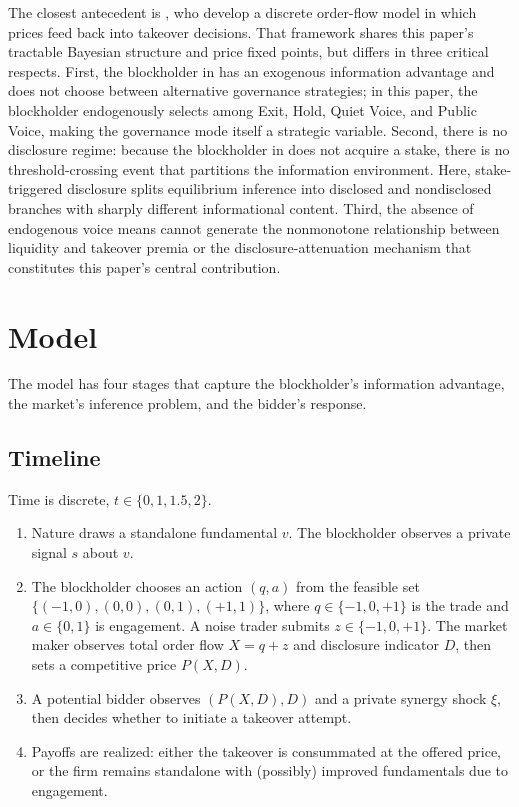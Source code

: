 \documentclass[11pt]{article}
\newcommand{\1}{\mathbf{1}}
\begin{document}
The closest antecedent is \citet{EdmansGoldsteinJiang2015}, who develop a discrete order-flow model in which prices feed back into takeover decisions. That framework shares this paper's tractable Bayesian structure and price fixed points, but differs in three critical respects. First, the blockholder in \citet{EdmansGoldsteinJiang2015} has an exogenous information advantage and does not choose between alternative governance strategies; in this paper, the blockholder endogenously selects among Exit, Hold, Quiet Voice, and Public Voice, making the governance mode itself a strategic variable. Second, there is no disclosure regime: because the blockholder in \citet{EdmansGoldsteinJiang2015} does not acquire a stake, there is no threshold-crossing event that partitions the information environment. Here, stake-triggered disclosure splits equilibrium inference into disclosed and nondisclosed branches with sharply different informational content. Third, the absence of endogenous voice means \citet{EdmansGoldsteinJiang2015} cannot generate the nonmonotone relationship between liquidity and takeover premia or the disclosure-attenuation mechanism that constitutes this paper's central contribution.
\section{Model}
\label{sec:model}

The model has four stages that capture the blockholder's information advantage, the market's inference problem, and the bidder's response.

%
\subsection{Timeline}
%

Time is discrete, $t \in \{0, 1, 1.5, 2\}$.

\begin{enumerate}[leftmargin=2em]
\item[$t=0$:] Nature draws a standalone fundamental $v$. The blockholder observes a private signal $s$ about $v$.
\item[$t=1$:] The blockholder chooses an action $(q,a)$ from the feasible set $\{(-1,0),(0,0),(0,1),(+1,1)\}$, where $q \in \{-1,0,+1\}$ is the trade and $a \in \{0,1\}$ is engagement. A noise trader submits $z \in \{-1, 0, +1\}$. The market maker observes total order flow $X = q + z$ and disclosure indicator $D$, then sets a competitive price $P(X, D)$.
\item[$t=1.5$:] A potential bidder observes $(P(X,D), D)$ and a private synergy shock $\xi$, then decides whether to initiate a takeover attempt.
\item[$t=2$:] Payoffs are realized: either the takeover is consummated at the offered price, or the firm remains standalone with (possibly) improved fundamentals due to engagement.
\end{enumerate}
\end{document}
